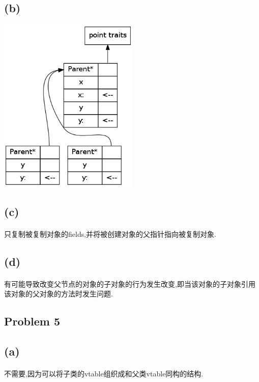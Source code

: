 \documentclass[A4paper,10pt]{paper}
\begin{document}
	\subsection*{(b)}
	\includegraphics[width=0.5\textwidth]{./pro4b.png}
	\subsection*{(c)}
	\paragraph{} 只复制被复制对象的fields,并将被创建对象的父指针指向被复制对象.
	
	\subsection*{(d)}
	\paragraph{} 有可能导致改变父节点的对象的子对象的行为发生改变,即当该对象的子对象引用该对象的父对象的方法时发生问题.
	
\subsection*{Problem 5}
	\subsection*{(a)}
	\paragraph{} 不需要,因为可以将子类的vtable组织成和父类vtable同构的结构.
	
\end{document}
